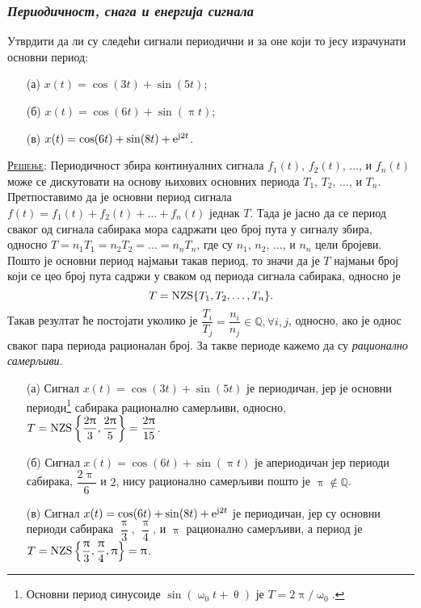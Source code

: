 \subsubsection{\textit{Периодичност, снага и енергија сигнала}}
\PID 
\noindent 
Утврдити да ли су следећи сигнали периодични и за оне који то јесу израчунати 
основни период:
\begin{multicols}{2}
\begin{enumerate}
\item[(а)] $x(t) = \cos(3t) + \sin(5t)$;
\item[(б)] $x(t) = \cos(6t) + \sin(\uppi t)$;
\item[(в)] $x(t) = \cos(6t) + \sin(8t) + {\rm e}^{{\rm j}2t}$.
\end{enumerate}
\end{multicols}

\textsc{\underline{Решење}}:
Периодичност збира континуалних сигнала $f_1(t)$, $f_2(t)$, $\ldots$, и $f_n(t)$ може се дискутовати на основу њихових основних 
периода $T_1$, $T_2$, $\ldots$, и $T_n$. Претпоставимо да је основни период сигнала 
$f(t) = f_1(t) + f_2(t) + \ldots + f_n(t)$ једнак $T$. Тада је јасно да се период сваког од сигнала сабирака 
мора садржати цео број пута у сигналу збира, односно $T = n_1T_1 = n_2T_2 = \ldots = n_nT_n$, где су $n_1$, $n_2$, $\ldots$, и $n_n$ 
цели бројеви. Пошто је основни период најмањи такав период, то значи да је $T$ најмањи број који се цео број пута 
садржи у сваком од периода сигнала сабирака, односно је
\begin{equation}
    T = {\rm NZS} \{ T_1, T_2, \ldots, T_n\}.
    \label{eq:nzs}
\end{equation}
Такав резултат ће постојати уколико је $\dfrac{T_i}{T_j} = \dfrac{n_i}{n_j} \in \mathbb Q, \forall i,j$,
односно, ако је однос сваког пара периода рационалан број.    
За такве периоде кажемо да су \textit{рационално самерљиви}.

\begin{enumerate}
    \item[(а)] Сигнал $x(t) = \cos(3t) + \sin(5t)$ је периодичан, јер је основни периоди\footnote{
    Основни период синусоиде $\sin(\upomega_0 t + \uptheta)$ је $T = 2\uppi /\upomega_0$.
    } сабирака рационално самерљиви, односно,  
    $T = {\rm NZS} \left\{ \dfrac{2\uppi}{3}, \dfrac{2\uppi}{5} \right\} = \dfrac{2\uppi}{15}$. 
    \item[(б)] Сигнал $x(t) = \cos(6t) + \sin(\uppi t)$ је 
    апериодичан јер периоди сабирака, $\dfrac{2\uppi}{6}$ и $2$, нису рационално самерљиви пошто је 
    $\uppi \not\in \mathbb Q$.
    \item [(в)] Сигнал $x(t) = \cos(6t) + \sin(8t) + {\rm e}^{{\rm j}2t}$ је периодичан, 
    јер су основни периоди сабирака
    $\dfrac{\uppi}{3}$, $\dfrac{\uppi}{4}$, и $\uppi$ рационално самерљиви, а период
    је $T = {\rm NZS} \left\{ \dfrac{\uppi}{3}, \dfrac{\uppi}{4}, \uppi \right\} = \uppi$.
\end{enumerate}